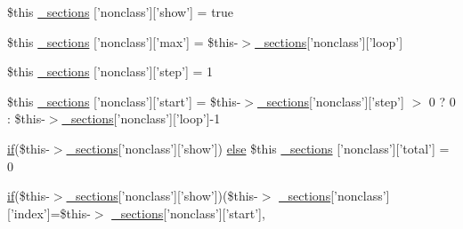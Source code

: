 \begin{DoxyCompactItemize}
\item 
\$this \hyperlink{_06_06-72_05_06_06-727729411_05left__frame_8tpl_8php_a369a5562eeef3b0aee7405f9bb165530}{\-\_\-sections} \mbox{[}'nonclass'\mbox{]}\mbox{[}'show'\mbox{]} = true
\item 
\$this \hyperlink{_06_06-72_05_06_06-727729411_05left__frame_8tpl_8php_a158a098e2e60b5fd19773cc2027a747e}{\-\_\-sections} \mbox{[}'nonclass'\mbox{]}\mbox{[}'max'\mbox{]} = \$this-\/$>$\hyperlink{_06_06127_05_06_0612781687_05pkgelementindex_8tpl_8php_a9e3d26b39edfe29c3f29b8035ef33828}{\-\_\-sections}\mbox{[}'nonclass'\mbox{]}\mbox{[}'loop'\mbox{]}
\item 
\$this \hyperlink{_06_06-72_05_06_06-727729411_05left__frame_8tpl_8php_ae92cc7a8d1dd215066ef17e6dc95945e}{\-\_\-sections} \mbox{[}'nonclass'\mbox{]}\mbox{[}'step'\mbox{]} = 1
\item 
\$this \hyperlink{_06_06-72_05_06_06-727729411_05left__frame_8tpl_8php_a87306b98192dbe026dd46fff4ca968f6}{\-\_\-sections} \mbox{[}'nonclass'\mbox{]}\mbox{[}'start'\mbox{]} = \$this-\/$>$\hyperlink{_06_06127_05_06_0612781687_05pkgelementindex_8tpl_8php_a9e3d26b39edfe29c3f29b8035ef33828}{\-\_\-sections}\mbox{[}'nonclass'\mbox{]}\mbox{[}'step'\mbox{]} $>$ 0 ? 0 \-: \$this-\/$>$\hyperlink{_06_06127_05_06_0612781687_05pkgelementindex_8tpl_8php_a9e3d26b39edfe29c3f29b8035ef33828}{\-\_\-sections}\mbox{[}'nonclass'\mbox{]}\mbox{[}'loop'\mbox{]}-\/1
\item 
\hyperlink{_setup_8inc_8php_ad0184337b31d13763ec8751feff4aabe}{if}(\$this-\/$>$\hyperlink{_06_06127_05_06_0612781687_05pkgelementindex_8tpl_8php_a9e3d26b39edfe29c3f29b8035ef33828}{\-\_\-sections}\mbox{[}'nonclass'\mbox{]}\mbox{[}'show'\mbox{]}) \*
\hyperlink{test__session_8php_a7ca5c3b9e4c46ab37c0418e95ddcfa36}{else} \$this \hyperlink{_06_06-72_05_06_06-727729411_05left__frame_8tpl_8php_a63302ee46ae6ebb0194d8d2bd7080d3f}{\-\_\-sections} \mbox{[}'nonclass'\mbox{]}\mbox{[}'total'\mbox{]} = 0
\item 
\hyperlink{_setup_8inc_8php_ad0184337b31d13763ec8751feff4aabe}{if}(\$this-\/$>$\hyperlink{_06_06127_05_06_0612781687_05pkgelementindex_8tpl_8php_a9e3d26b39edfe29c3f29b8035ef33828}{\-\_\-sections}\mbox{[}'nonclass'\mbox{]}\mbox{[}'show'\mbox{]})(\$this-\/$>$\*
\hyperlink{_06_06127_05_06_0612781687_05pkgelementindex_8tpl_8php_a9e3d26b39edfe29c3f29b8035ef33828}{\-\_\-sections}\mbox{[}'nonclass'\mbox{]}\mbox{[}'index'\mbox{]}=\$this-\/$>$\*
\hyperlink{_06_06127_05_06_0612781687_05pkgelementindex_8tpl_8php_a9e3d26b39edfe29c3f29b8035ef33828}{\-\_\-sections}\mbox{[}'nonclass'\mbox{]}\mbox{[}'start'\mbox{]}, \*

\end{DoxyCompactItemize}
